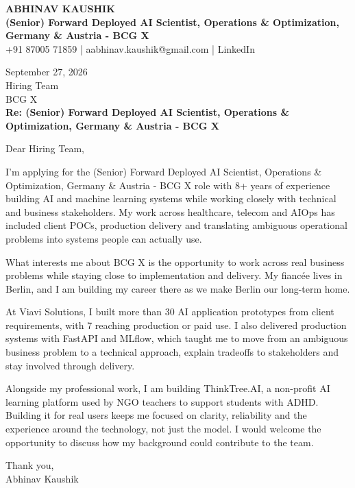\documentclass[10pt,a4paper]{article}
\begin{document}
\begin{center}
{\Large\bfseries ABHINAV KAUSHIK}\\[2pt]
{\bfseries (Senior) Forward Deployed AI Scientist, Operations \& Optimization, Germany \& Austria - BCG X}\\[2pt]
+91 87005 71859 \quad | \quad aabhinav.kaushik@gmail.com \quad | \quad LinkedIn
\end{center}
\vspace{8pt}
September 27, 2026\\[6pt]
Hiring Team\\
BCG X\\[4pt]
\textbf{Re: (Senior) Forward Deployed AI Scientist, Operations \& Optimization, Germany \& Austria - BCG X}

Dear Hiring Team,

I’m applying for the (Senior) Forward Deployed AI Scientist, Operations \& Optimization, Germany \& Austria - BCG X role with 8+ years of experience building AI and machine learning systems while working closely with technical and business stakeholders. My work across healthcare, telecom and AIOps has included client POCs, production delivery and translating ambiguous operational problems into systems people can actually use.

What interests me about BCG X is the opportunity to work across real business problems while staying close to implementation and delivery. My fiancée lives in Berlin, and I am building my career there as we make Berlin our long-term home.

At Viavi Solutions, I built more than 30 AI application prototypes from client requirements, with 7 reaching production or paid use. I also delivered production systems with FastAPI and MLflow, which taught me to move from an ambiguous business problem to a technical approach, explain tradeoffs to stakeholders and stay involved through delivery.

Alongside my professional work, I am building ThinkTree.AI, a non-profit AI learning platform used by NGO teachers to support students with ADHD. Building it for real users keeps me focused on clarity, reliability and the experience around the technology, not just the model. I would welcome the opportunity to discuss how my background could contribute to the team.

Thank you,\\
Abhinav Kaushik
\end{document}
